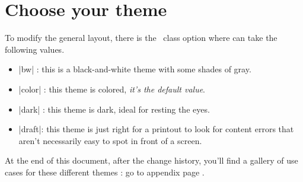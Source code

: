 \documentclass[10pt, a4paper]{tutodoc}
\begin{document}
\section{Choose your theme}

	To modify the general layout, there is the \thisproj\ class option  where  can take the following values.

\begin{itemize}
	\item \tdocinlatex|bw| :
	this is a black-and-white theme with some shades of gray.

	\item \tdocinlatex|color| :
	this theme is colored, \emph{it's the default value}.

	\item \tdocinlatex|dark| :
	this theme is dark, ideal for resting the eyes.

	\item \tdocinlatex|draft|:
	this theme is just right for a printout to look for content errors that aren't necessarily easy to spot in front of a screen.
\end{itemize}


\begin{tdocnote}
	At the end of this document, after the change history, you'll find a gallery of use cases for these different themes : go to appendix page \pageref{tutodoc-theme-gallery}.
\end{tdocnote}
\end{document}
